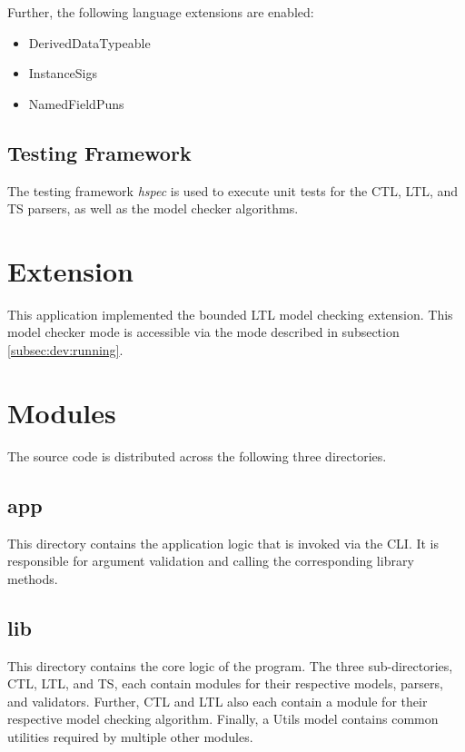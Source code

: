 \documentclass[11pt]{article}
\begin{document}
Further, the following language extensions are enabled:

\begin{itemize}
  \item DerivedDataTypeable
  \item InstanceSigs
  \item NamedFieldPuns
\end{itemize}


\subsection{Testing Framework}

The testing framework \textit{hspec} is used to execute unit tests for the CTL, LTL, and TS parsers, as well as the model checker algorithms.

\section{Extension}

This application implemented the bounded LTL model checking extension.
This model checker mode is accessible via the mode described in subsection \ref{subsec:dev:running}.

\section{Modules}

The source code is distributed across the following three directories.

\subsection{app}

This directory contains the application logic that is invoked via the CLI.
It is responsible for argument validation and calling the corresponding library methods.

\subsection{lib}

This directory contains the core logic of the program.
The three sub-directories, CTL, LTL, and TS, each contain modules for their respective models, parsers, and validators.
Further, CTL and LTL also each contain a module for their respective model checking algorithm.
Finally, a Utils model contains common utilities required by multiple other modules. 
\end{document}
